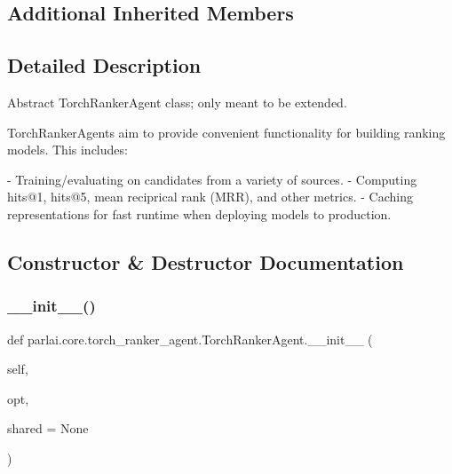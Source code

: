 \subsection*{Additional Inherited Members}


\subsection{Detailed Description}
\begin{DoxyVerb}Abstract TorchRankerAgent class; only meant to be extended.

TorchRankerAgents aim to provide convenient functionality for building ranking
models. This includes:

- Training/evaluating on candidates from a variety of sources.
- Computing hits@1, hits@5, mean reciprical rank (MRR), and other metrics.
- Caching representations for fast runtime when deploying models to production.
\end{DoxyVerb}
 

\subsection{Constructor \& Destructor Documentation}
\mbox{\label{classparlai_1_1core_1_1torch__ranker__agent_1_1TorchRankerAgent_acde404a79bf3678bb52d3e6c3ee5244a}} 
\subsubsection{\texorpdfstring{\+\_\+\+\_\+init\+\_\+\+\_\+()}{\_\_init\_\_()}}
{\footnotesize\ttfamily def parlai.\+core.\+torch\+\_\+ranker\+\_\+agent.\+Torch\+Ranker\+Agent.\+\_\+\+\_\+init\+\_\+\+\_\+ (\begin{DoxyParamCaption}\item[{}]{self,  }\item[{}]{opt,  }\item[{}]{shared = {\ttfamily None} }\end{DoxyParamCaption})}



